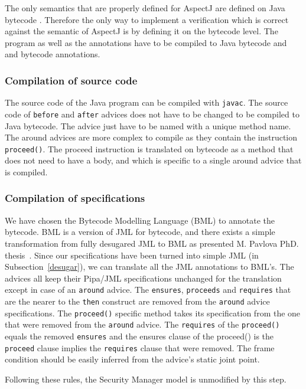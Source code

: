 The only semantics that are properly defined for AspectJ are defined
on Java bytecode \cite{weaving06,weaving04}. Therefore the only way to
implement a verification which is correct against the semantic of
AspectJ is by defining it on the bytecode level.  The program as well
as the annotations have to be compiled to Java bytecode and
and bytecode annotations. 

\subsubsection{Compilation of source code}
The source code of the Java program can be compiled with {\tt javac}.
The source code of {\tt before} and {\tt after}
advices does not have to be changed to be compiled to Java bytecode.
The advice just have to be named with a unique method name.
The around advices are more complex to compile as they contain the instruction
{\tt proceed()}. The proceed instruction is translated on bytecode as
a method that does not need to have a body, and which is specific 
to a single around advice that is compiled.


\subsubsection{Compilation of specifications} 
We have chosen the Bytecode Modelling Language (BML) to annotate the
bytecode. BML is a version of JML for bytecode, and there exists a
simple transformation from fully desugared JML to BML as presented
M. Pavlova PhD. thesis~\cite{PavlovaPhd}. Since our specifications
have been turned into simple JML (in Subsection~\ref{desugar}), we can
translate all the JML annotations to BML's. The advices all keep their
Pipa/JML specifications unchanged for the translation
except in case of an {\tt around} advice.
The {\tt ensures}, {\tt proceeds} and {\tt requires} that are the
nearer to the {\tt then} construct are removed from the {\tt around}
advice specifications. The {\tt proceed()} specific method takes its
specification from the one that were removed from the {\tt around} advice.
The {\tt requires} of the {\tt proceed()} equals the removed {\tt ensures}
and the ensures clause of the proceed() is the {\tt proceed} clause 
implies the {\tt requires} clause that were removed.
The frame condition should be easily inferred from the advice's 
static joint point.

Following these rules, the Security Manager model is unmodified by this step.

